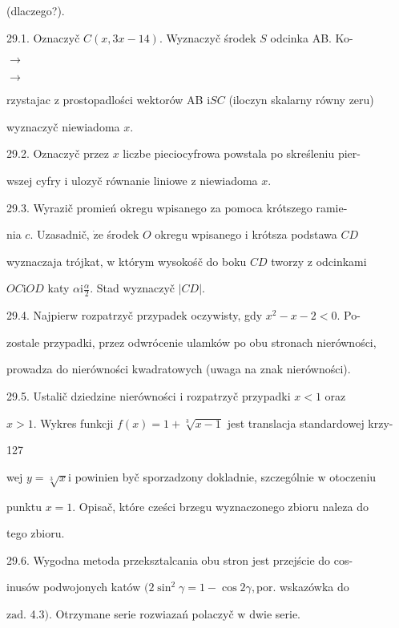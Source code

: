 \documentclass[a4paper,12pt]{article}
\begin{document}
(dlaczego?).

29.1. Oznaczyč $C(x,3x-14)$. Wyznaczyč środek $S$ odcinka AB. Ko-

$\rightarrow$

$\rightarrow$

rzystajac $\mathrm{z}$ prostopadlości wektorów AB $\mathrm{i}SC$ (iloczyn skalarny równy zeru)

wyznaczyč niewiadoma $x.$

29.2. Oznaczyč przez $x$ liczbe pieciocyfrowa powstala po skreśleniu pier-

wszej cyfry $\mathrm{i}$ ulozyč równanie liniowe $\mathrm{z}$ niewiadoma $x.$

29.3. Wyrazič promień okregu wpisanego za pomoca krótszego ramie-

nia $c$. Uzasadnič, $\dot{\mathrm{z}}\mathrm{e}$ środek $O$ okregu wpisanego $\mathrm{i}$ krótsza podstawa $CD$

wyznaczaja trójkat, $\mathrm{w}$ którym wysokośč do boku $CD$ tworzy $\mathrm{z}$ odcinkami

$OC\mathrm{i}OD$ katy $\displaystyle \alpha \mathrm{i}\frac{\alpha}{2}$. Stad wyznaczyč $|CD|.$

29.4. Najpierw rozpatrzyč przypadek oczywisty, gdy $x^{2}-x-2<0$. Po-

zostale przypadki, przez odwrócenie ulamków po obu stronach nierówności,

prowadza do nierówności kwadratowych (uwaga na znak nierówności).

29.5. Ustalič dziedzine nierówności $\mathrm{i}$ rozpatrzyč przypadki $x< 1$ oraz

$x>1$. Wykres funkcji $f(x)=1+\sqrt[3]{x-1}$ jest translacja standardowej krzy-





127

wej $y=\sqrt[3]{x}\mathrm{i}$ powinien byč sporzadzony dokladnie, szczególnie $\mathrm{w}$ otoczeniu

punktu $x=1$. Opisač, które cześci brzegu wyznaczonego zbioru naleza do

tego zbioru.

29.6. Wygodna metoda przeksztalcania obu stron jest przejście do cos-

inusów podwojonych katów $(2\sin^{2}\gamma = 1-\cos 2\gamma, \mathrm{p}\mathrm{o}\mathrm{r}$. wskazówka do

$\mathrm{z}\mathrm{a}\mathrm{d}$. 4.3$)$. Otrzymane serie rozwiazań polaczyč $\mathrm{w}$ dwie serie.
\end{document}
